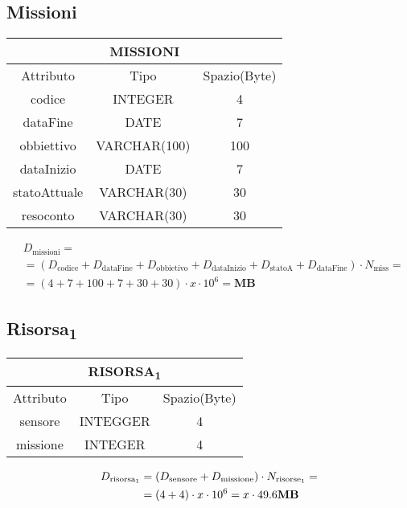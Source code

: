 \subsection{Missioni}
\begin{tabular}{ |c|c|c|}
  \hline
  \multicolumn{3}{|c|}{\textbf{MISSIONI}}\\
  \hline
  Attributo & Tipo & Spazio(Byte) \\
  \hline
  codice & INTEGER & 4 \\
  dataFine & DATE & 7 \\
  obbiettivo & VARCHAR(100) & 100 \\
  dataInizio & DATE & 7 \\
  statoAttuale  & VARCHAR(30) & 30 \\
  resoconto & VARCHAR(30) & 30 \\
  \hline
\end{tabular}
\begin{equation}
  \begin{aligned}
    &D_{\text{missioni}} =\\
    &=(D_{\text{codice}}+D_{\text{dataFine}}+D_{\text{obbietivo}}+D_{\text{dataInizio}}+D_{\text{statoA}}+D_{\text{dataFine}})\cdot N_{\text{miss}}=\\
    &=(4+7+100+7+30+30)\cdot x\cdot 10^6= \textbf{MB}
  \end{aligned}
\end{equation}
\subsection{Risorsa\textsubscript{1}}
\begin{tabular}{|c|c|c|}
  \hline
  \multicolumn{3}{|c|}{\textbf{RISORSA\textsubscript{1}}}\\
  \hline
  Attributo & Tipo & Spazio(Byte) \\
  \hline
  sensore & INTEGGER & 4 \\
  missione & INTEGER & 4 \\
  \hline
\end{tabular}
\begin{equation}
  \begin{aligned}
    D_{\text{risorsa\textsubscript{1}}}&=(D_{\text{sensore}} + D_{\text{missione}}) \cdot N_{\text{risorse\textsubscript{1}}}=\\
    &=(4+4)\cdot x\cdot 10^6=x\cdot 49.6  \text{\textbf{MB}}\\
  \end{aligned}
\end{equation}
